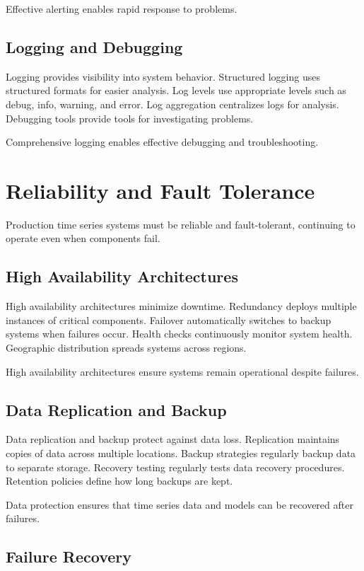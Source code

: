 Effective alerting enables rapid response to problems.

\subsection{Logging and Debugging}

Logging provides visibility into system behavior. Structured logging uses structured formats for easier analysis. Log levels use appropriate levels such as debug, info, warning, and error. Log aggregation centralizes logs for analysis. Debugging tools provide tools for investigating problems.

Comprehensive logging enables effective debugging and troubleshooting.

\section{Reliability and Fault Tolerance}

Production time series systems must be reliable and fault-tolerant, continuing to operate even when components fail.

\subsection{High Availability Architectures}

High availability architectures minimize downtime. Redundancy deploys multiple instances of critical components. Failover automatically switches to backup systems when failures occur. Health checks continuously monitor system health. Geographic distribution spreads systems across regions.

High availability architectures ensure systems remain operational despite failures.

\subsection{Data Replication and Backup}

Data replication and backup protect against data loss. Replication maintains copies of data across multiple locations. Backup strategies regularly backup data to separate storage. Recovery testing regularly tests data recovery procedures. Retention policies define how long backups are kept.

Data protection ensures that time series data and models can be recovered after failures.

\subsection{Failure Recovery}

